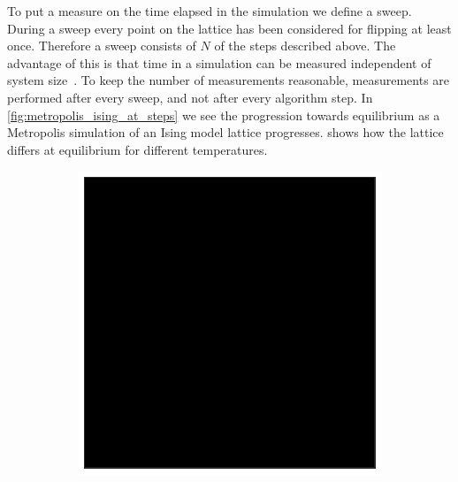 \documentclass[11pt, a4paper]{report} %
\begin{document}
To put a measure on the time elapsed in the simulation we define a sweep.
During a sweep every point on the lattice has been considered for flipping at least once.
Therefore a sweep consists of \(N\) of the steps described above.
The advantage of this is that time in a simulation can be measured independent of system size~\cite{newman:1999}.
To keep the number of measurements reasonable, measurements are performed after every sweep, and not after every algorithm step.
In \cref{fig:metropolis_ising_at_steps} we see the progression towards equilibrium as a Metropolis simulation of an Ising model lattice progresses.
 shows how the lattice differs at equilibrium for different temperatures.

\begin{figure}[htb]
	\centering
	\begin{subfigure}[c]{0.2\linewidth}
		\includegraphics[width=\linewidth]{20160603124433_40_by_40_Lattice_step0.pdf}
	\end{subfigure}
	~
	\begin{subfigure}[c]{0.2\linewidth}

\end{subfigure}
\end{figure}
\end{document}
